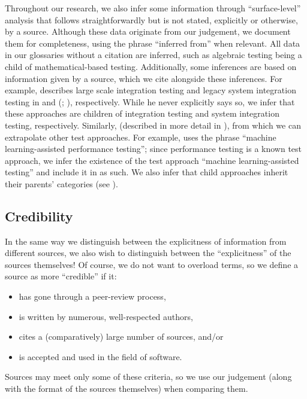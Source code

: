 \ifnotpaper
    \label{infers}
    Throughout our research, we also infer some information through
    ``surface-level'' analysis that follows straightforwardly but is not stated,
    explicitly or otherwise, by a source. Although these data originate from
    our judgement, we document them for completeness, using the phrase
    ``inferred from'' when relevant. All data in our glossaries without a
    citation are inferred, such as algebraic testing
    \citep[Fig.~12.2]{PetersAndPedrycz2000} being a child of mathematical-based
    testing. Additionally, some inferences are based on information given by a
    source, which we cite alongside these inferences. For example,
    \citeauthor{Gerrard2000a} describes large scale integration testing and
    legacy system integration testing in \citeyearpar[p.~30]{Gerrard2000b} and
    (\citeyear[Tab.~2]{Gerrard2000a}; \citeyear[Tab.~1]{Gerrard2000b}),
    respectively. While he never explicitly says so, we infer that these
    approaches are children of integration testing and system integration
    testing, respectively. Similarly, \orthTestIntro* (described in
    more detail in ), from which we can extrapolate other test
    approaches. For example, \citet{Moghadam2019} uses the phrase ``machine
    learning-assisted performance testing''; since performance testing is a
    known test approach, we infer the existence of the test approach ``machine
    learning-assisted testing'' and include it in \ourApproachGlossary{} as
    such. We also infer that child approaches inherit their parents' categories
    (see ).
\fi

\subsection{Credibility}\label{cred}

In the same way we distinguish between the explicitness of information from
different sources, we also wish to distinguish between the ``explicitness'' of the
sources themselves! Of course, we do not want to overload terms, so we define a
source as more ``credible'' if it:
\begin{itemize}
    \item has gone through a peer-review process,
    \item is written by numerous, well-respected authors,
    \item cites a (comparatively) large number of sources, and/or
    \item is accepted and used in the field of software.
\end{itemize}
Sources may meet only some of these criteria, so we use our judgement (along
with the format of the sources themselves) when comparing them.

